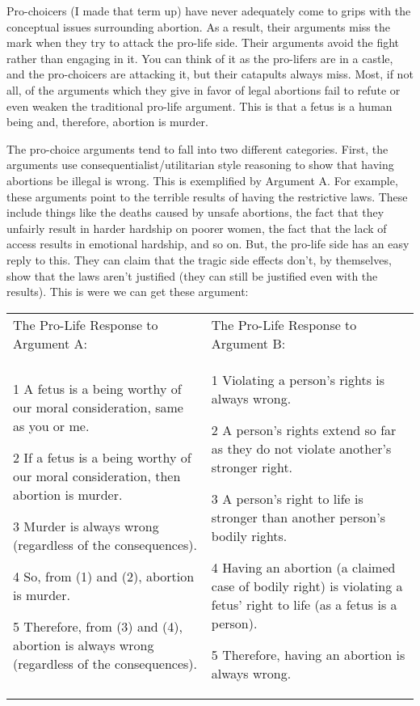 Pro-choicers (I made that term up) have never adequately come to grips with the conceptual issues surrounding abortion. As a result, their arguments miss the mark when they try to attack the pro-life side. Their arguments avoid the fight rather than engaging in it. You can think of it as the pro-lifers are in a castle, and the pro-choicers are attacking it, but their catapults always miss.  Most, if not all, of the arguments which they give in favor of legal abortions fail to refute or even weaken the traditional pro-life argument. This is that a fetus is a human being and, therefore, abortion is murder.

The pro-choice arguments tend to fall into two different categories. First, the arguments use consequentialist/utilitarian style reasoning to show that having abortions be illegal is wrong. This is exemplified by Argument A. For example, these arguments point to the terrible results of having the restrictive laws. These include things like the deaths caused by unsafe abortions, the fact that they unfairly result in harder hardship on poorer women, the fact that the lack of access results in emotional hardship, and so on. But, the pro-life side has an easy reply to this. They can claim that the tragic side effects don't, by themselves, show that the laws aren't justified (they can still be justified even with the results). This is were we can get these argument: 

\begin{tabular}{p{2in}|p{2in}}
The Pro-Life Response to Argument A:&The Pro-Life Response to Argument B:\\
\begin{earg}
    \item[1 ] A fetus is a being worthy of our moral consideration, same as you or me.
    \item[2 ] If a fetus is a being worthy of our moral consideration, then abortion is murder.
    \item[3 ] Murder is always wrong (regardless of the consequences).
    \item[4 ] So, from (1) and (2), abortion is murder.
    \item[5 ] Therefore, from (3) and (4), abortion is always wrong (regardless of the consequences). 
\end{earg}&
\begin{earg}
    \item[1 ] Violating a person's rights is always wrong.
    \item[2 ] A person's rights extend so far as they do not violate another's stronger right.
    \item[3 ] A person's right to life is stronger than another person's bodily rights.
    \item[4 ] Having an abortion (a claimed case of bodily right) is violating a fetus' right to life (as a fetus is a person).
    \item[5 ] Therefore, having an abortion is always wrong.
\end{earg}
\end{tabular}

